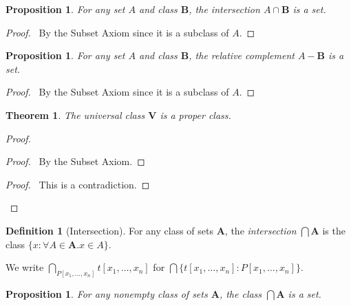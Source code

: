\documentclass{article}
\let\qed\relax
\newtheorem{proposition}[axiom]{Proposition}
\newtheorem{theorem}[axiom]{Theorem}
\theoremstyle{definition}
\newtheorem{definition}[axiom]{Definition}
\begin{document}
    \begin{proposition}
        For any set $A$ and class $\mathbf{B}$, the intersection $A \cap \mathbf{B}$ is a set.
    \end{proposition}

    \begin{proof}
        \pf\ By the Subset Axiom since it is a subclass of $A$. \qed
    \end{proof}

    \begin{proposition}
        For any set $A$ and class $\mathbf{B}$, the relative complement $A - \mathbf{B}$ is a set.
    \end{proposition}

    \begin{proof}
        \pf\ By the Subset Axiom since it is a subclass of $A$. \qed
    \end{proof}

    \begin{theorem}
        The universal class $\mathbf{V}$ is a proper class.
    \end{theorem}

    \begin{proof}
        \pf
        \begin{proof}
            \pf\ By the Subset Axiom.
        \end{proof}
        \qedstep
        \begin{proof}
            \pf\ This is a contradiction.
        \end{proof}
        \qed
    \end{proof}
    
    \begin{definition}[Intersection]
        For any class of sets $\mathbf{A}$, the \emph{intersection} $\bigcap \mathbf{A}$ is the class
        $\{ x : \forall A \in \mathbf{A}. x \in A \}$.

        We write $\bigcap_{P[x_1, \ldots, x_n]} t[x_1, \ldots, x_n]$ for $\bigcap \{ t[x_1, \ldots, x_n]
        : P[x_1, \ldots, x_n] \}$.
    \end{definition}

    \begin{proposition}
        For any nonempty class of sets $\mathbf{A}$, the class $\bigcap \mathbf{A}$ is a set.
    \end{proposition}
\end{document}
